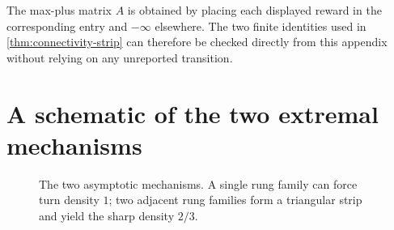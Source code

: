 \documentclass[11pt]{article}
\theoremstyle{definition}
\begin{document}
The max-plus matrix $A$ is obtained by placing each displayed reward in the corresponding entry and $-\infty$ elsewhere.  The two finite identities used in \cref{thm:connectivity-strip} can therefore be checked directly from this appendix without relying on any unreported transition.

\section{A schematic of the two extremal mechanisms}
\begin{figure}[h]
\centering
{}
\caption{The two asymptotic mechanisms.  A single rung family can force turn density $1$; two adjacent rung families form a triangular strip and yield the sharp density $2/3$.}
\end{figure}
\end{document}
